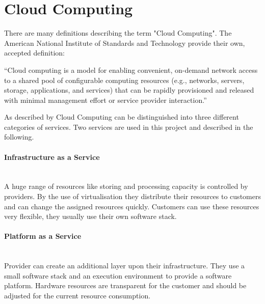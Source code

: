 \section{Cloud Computing}

There are many definitions describing the term "Cloud Computing". The American National Institute of Standards and Technology provide their own, accepted definition:

“Cloud computing is a model for enabling convenient, on-demand network access to a shared pool of configurable computing resources (e.g., networks, servers, storage, applications, and services) that can be rapidly provisioned and released with minimal management effort or service provider interaction.” \citep{mell2009}

As described by \citet{vaquero2009} Cloud Computing can be distinguished into three different categories of services. Two services are used in this project and described in the following.


\paragraph{Infrastructure as a Service}~\\
A huge range of resources like storing and processing capacity is controlled by providers. By the use of virtualisation they distribute their resources to customers and can change the assigned resources quickly. Customers can use these resources very flexible, they usually use their own software stack. 

\paragraph{Platform as a Service}~\\
Provider can create an additional layer upon their infrastructure. They use a small software stack and an execution environment to provide a software platform. Hardware resources are transparent for the customer and should be adjusted for the current resource consumption. 


